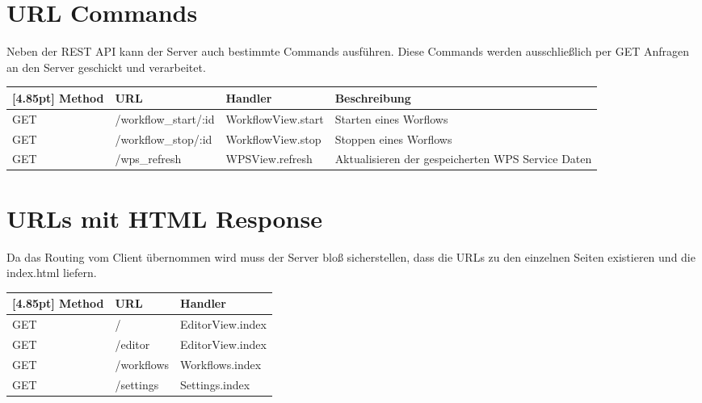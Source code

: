 \newpage

	\section{URL Commands}
	Neben der REST API kann der Server auch bestimmte Commands ausführen. Diese Commands werden ausschließlich per GET Anfragen an
	den Server geschickt und verarbeitet.
	
	\begin{center}
	    \setlength\tabcolsep{5pt}
    	\renewcommand{\arraystretch}{1.5}
        	\begin{tabularx}{\textwidth}{|l|l|l|X|}
        	\hline
        	\rowcolor[gray]{0.75}[4.85pt]
    		Method & URL & Handler & Beschreibung \\ \hline 
            GET & /workflow_start/:id & WorkflowView.start & Starten eines Worflows \\ \hline
            GET & /workflow_stop/:id & WorkflowView.stop & Stoppen eines Worflows \\ \hline
            GET & /wps_refresh & WPSView.refresh & Aktualisieren der gespeicherten WPS Service Daten \\ \hline
        	\end{tabularx}
	\end{center}
	
	\section{URLs mit HTML Response}
	Da das Routing vom Client übernommen wird muss der Server bloß sicherstellen, dass die URLs zu den einzelnen Seiten existieren
	und die index.html liefern.
	
	\begin{center}
	    \setlength\tabcolsep{5pt}
    	\renewcommand{\arraystretch}{1.5}
        \begin{tabularx}{\textwidth}{|l|l|X|}
        	\hline
        	\rowcolor[gray]{0.75}[4.85pt]
    		Method & URL & Handler \\ \hline 
            GET & / & EditorView.index \\ \hline
            GET & /editor & EditorView.index \\ \hline
            GET & /workflows & Workflows.index \\ \hline
            GET & /settings & Settings.index \\ \hline
        \end{tabularx}
	\end{center}